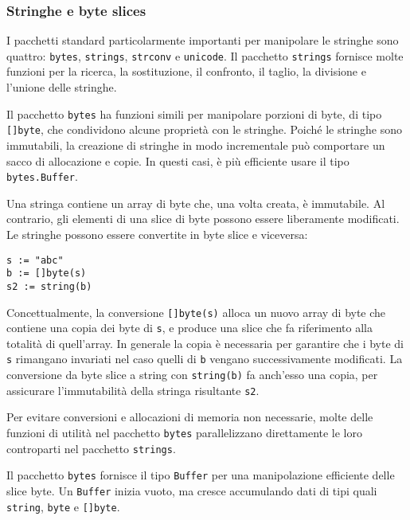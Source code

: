 \documentclass[../../../thesis.tex]{subfiles}
\begin{document}
    \subsubsection{Stringhe e byte slices}
    I pacchetti standard particolarmente importanti per manipolare le stringhe sono quattro: \verb"bytes", \verb"strings", \verb"strconv" e \verb"unicode".
    Il pacchetto \verb"strings" fornisce molte funzioni per la ricerca, la sostituzione, il confronto, il taglio, la divisione e l'unione delle stringhe.
    \hfill \vspace{12pt}

    Il pacchetto \verb"bytes" ha funzioni simili per manipolare porzioni di byte, di tipo \verb"[]byte", che condividono alcune proprietà con le stringhe.
    Poiché le stringhe sono immutabili, la creazione di stringhe in modo incrementale può comportare un sacco di allocazione e copie.
    In questi casi, è più efficiente usare il tipo \verb"bytes.Buffer".
    \hfill \vspace{12pt}

    Una stringa contiene un array di byte che, una volta creata, è immutabile.
    Al contrario, gli elementi di una slice di byte possono essere liberamente modificati.
    Le stringhe possono essere convertite in byte slice e viceversa:
    \begin{lstlisting}[frame = single,label={lst:lstlisting2-2-4.1}]
s := "abc"
b := []byte(s)
s2 := string(b)
    \end{lstlisting}
    Concettualmente, la conversione \verb"[]byte(s)" alloca un nuovo array di byte che contiene una copia dei byte di \verb"s", e produce una slice che fa riferimento alla totalità di quell'array.
    In generale la copia è necessaria per garantire che i byte di \verb"s" rimangano invariati nel caso quelli di \verb"b" vengano successivamente modificati.
    La conversione da byte slice a string con \verb"string(b)" fa anch'esso una copia, per assicurare l'immutabilità della stringa risultante \verb"s2".
    \hfill \vspace{12pt}

    Per evitare conversioni e allocazioni di memoria non necessarie, molte delle funzioni di utilità nel pacchetto \verb"bytes" parallelizzano direttamente le loro controparti nel pacchetto \verb"strings".
    \hfill \vspace{12pt}

    Il pacchetto \verb"bytes" fornisce il tipo \verb"Buffer" per una manipolazione efficiente delle slice byte.
    Un \verb"Buffer" inizia vuoto, ma cresce accumulando dati di tipi quali \verb"string", \verb"byte" e \verb"[]byte".
\end{document}
